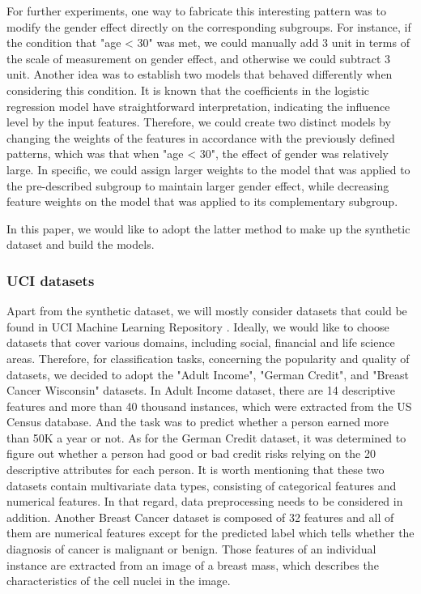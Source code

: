 For further experiments, one way to fabricate this interesting pattern was to modify the gender effect directly on the corresponding subgroups. For instance, if the condition that "age < 30" was met, we could manually add 3 unit in terms of the scale of measurement on gender effect, and otherwise we could subtract 3 unit. Another idea was to establish two models that behaved differently when considering this condition. It is known that the coefficients in the logistic regression model have straightforward interpretation, indicating the influence level by the input features. Therefore, we could create two distinct models by changing the weights of the features in accordance with the previously defined patterns, which was that when "age < 30", the effect of gender was relatively large. In specific, we could assign larger weights to the model that was applied to the pre-described subgroup to maintain larger gender effect, while decreasing feature weights on the model that was applied to its complementary subgroup.

In this paper, we would like to adopt the latter method to make up the synthetic dataset and build the models. 

\subsubsection{UCI datasets}

Apart from the synthetic dataset, we will mostly consider datasets that could be found in UCI Machine Learning Repository \cite{asuncion2007uci}\cite{Dua:2019}. Ideally, we would like to choose datasets that cover various domains, including social, financial and life science areas. Therefore, for classification tasks, concerning the popularity and quality of datasets, we decided to adopt the "Adult Income", "German Credit", and "Breast Cancer Wisconsin" datasets. In Adult Income dataset, there are 14 descriptive features and more than 40 thousand instances, which were extracted from the US Census database. And the task was to predict whether a person earned more than 50K a year or not. As for the German Credit dataset, it was determined to figure out whether a person had good or bad credit risks relying on the 20 descriptive attributes for each person. It is worth mentioning that these two datasets contain multivariate data types, consisting of categorical features and numerical features. In that regard, data preprocessing needs to be considered in addition. Another Breast Cancer dataset is composed of 32 features and all of them are numerical features except for the predicted label which tells whether the diagnosis of cancer is malignant or benign. Those features of an individual instance are extracted from an image of a breast mass, which describes the characteristics of the cell nuclei in the image. 

